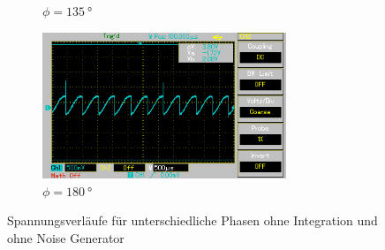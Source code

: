 \begin{figure}
\begin{subfigure}{0.5\textwidth}
    \caption{$\phi = \qty[]{135}{\degree}$}%
    \label{fig:phase4}%
    \end{subfigure}%
    \hfill
    \begin{subfigure}{0.5\textwidth}%
    \centering%
    \includegraphics[width = 7.3cm]{./Oszilloskop Bilder/png/5.2/5 MAP006.png}%
    \caption{$\phi = \qty[]{180}{\degree}$}%
    \label{fig:phase5}%
    \end{subfigure}%
    \caption{Spannungsverläufe für unterschiedliche Phasen ohne Integration und ohne Noise Generator}%
    \label{fig:phasenunterschiede_ohne_noise}%
\end{figure}%
%  
%

